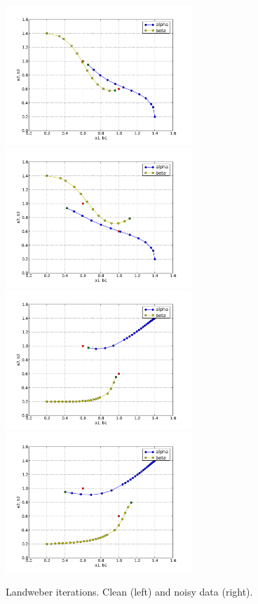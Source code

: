 \begin{figure}
\begin{center}
    \includegraphics[width=7cm]{chapters/schroll/pdf/4D-1scan3b.pdf}
    \includegraphics[width=7cm]{chapters/schroll/pdf/4D-1scan3b-5.pdf}
    \includegraphics[width=7cm]{chapters/schroll/pdf/4D-1scan4b.pdf}
    \includegraphics[width=7cm]{chapters/schroll/pdf/4D-1scan4b-5.pdf}
    \vspace{-0.7cm}
    \caption{Landweber iterations. Clean (left) and noisy data (right).}
    \label{fig6}
  \end{center}
\end{figure}

